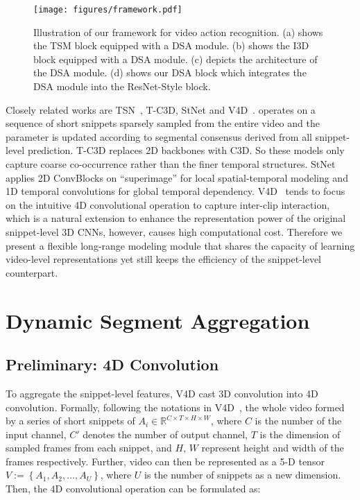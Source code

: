 \documentclass[sigconf]{acmart}
\begin{document}
\begin{figure*}[t]
    \centering
    \texttt{[image: figures/framework.pdf]}
    \caption{Illustration of our framework for video action recognition. (a) shows the TSM block equipped with a DSA module. (b) shows the I3D block equipped with a DSA module. (c) depicts the architecture of the DSA module. (d) shows our DSA block which integrates the DSA module into the ResNet-Style block.}
    \label{fig:dsa}
\end{figure*} 

Closely related works are TSN~\cite{tsn}, T-C3D\cite{tc3d}, StNet\cite{he2019stnet} and V4D~\cite{zhang2020v4d}.
\cite{tsn} operates on a sequence of short snippets sparsely sampled from the entire video and the parameter is updated according to segmental consensus derived from all snippet-level prediction. T-C3D replaces 2D backbones with C3D. So these models only capture coarse co-occurrence rather than the finer temporal structures. StNet applies 2D ConvBlocks on ``superimage'' for local spatial-temporal modeling and 1D temporal convolutions for global temporal dependency. V4D~\cite{zhang2020v4d} tends to focus on the intuitive 4D convolutional operation to capture inter-clip interaction, which is a natural extension to enhance the representation power of the original snippet-level 3D CNNs, however, causes high computational cost.
Therefore we present a flexible long-range modeling module that shares the capacity of learning video-level representations yet still keeps the efficiency of the snippet-level counterpart.








\section{Dynamic Segment Aggregation}


\subsection{Preliminary: 4D Convolution}
To aggregate the snippet-level features, V4D cast 3D convolution into 4D convolution. Formally, following the notations in V4D~\cite{zhang2020v4d}, the whole video formed by a series of short snippets of $A_{i} \in \mathbb{R}^{C \times T \times H \times W}$, where $C$ is the number of the input channel, $C'$ denotes the number of output channel, $T$ is the dimension of sampled frames from each snippet, and $H$, $W$ represent height and width of the frames respectively.
Further, video can then be represented as a 5-D tensor $V:=\left\{A_{1}, A_{2}, \ldots, A_{U}\right\}$, where $U$ is the number of snippets as a new dimension. Then, the 4D convolutional operation can be formulated as:
\end{document}
